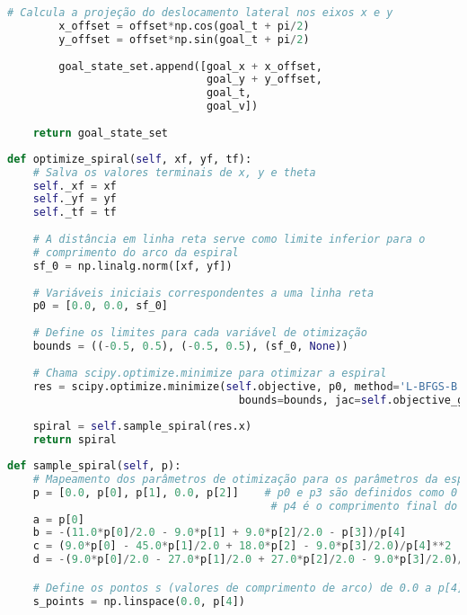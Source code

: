 \documentclass[
	12pt,				%
	oneside, %
	a4paper,			%
	english,			%
	french,				%
	spanish,			%
	brazil				%
	]{abntex2}
\begin{document}
\begin{apendicesenv}
\begin{lstlisting}[language=Python, caption=Implementação do método para geração de estados-objetivo do \textit{Conformal Lattice Planner}., label=lst:get_goal_state_set_implementation]
        # Calcula a projeção do deslocamento lateral nos eixos x e y
        x_offset = offset*np.cos(goal_t + pi/2)
        y_offset = offset*np.sin(goal_t + pi/2)
        
        goal_state_set.append([goal_x + x_offset, 
                               goal_y + y_offset, 
                               goal_t, 
                               goal_v])
       
    return goal_state_set
\end{lstlisting}

\begin{lstlisting}[language=Python, caption=Implementação do método de otimização de espirais paramétricas., label=lst:optimize_spiral_implementation]
def optimize_spiral(self, xf, yf, tf):
    # Salva os valores terminais de x, y e theta
    self._xf = xf
    self._yf = yf
    self._tf = tf
    
    # A distância em linha reta serve como limite inferior para o
    # comprimento do arco da espiral
    sf_0 = np.linalg.norm([xf, yf])
    
    # Variáveis iniciais correspondentes a uma linha reta
    p0 = [0.0, 0.0, sf_0]
    
    # Define os limites para cada variável de otimização
    bounds = ((-0.5, 0.5), (-0.5, 0.5), (sf_0, None))
    
    # Chama scipy.optimize.minimize para otimizar a espiral
    res = scipy.optimize.minimize(self.objective, p0, method='L-BFGS-B', 
                                    bounds=bounds, jac=self.objective_grad)
    
    spiral = self.sample_spiral(res.x)
    return spiral
\end{lstlisting}

\begin{lstlisting}[language=Python, caption=Implementação do método para amostragem de pontos ao longo da espiral otimizada., label=lst:sample_spiral_implementation]
def sample_spiral(self, p):
    # Mapeamento dos parâmetros de otimização para os parâmetros da espiral
    p = [0.0, p[0], p[1], 0.0, p[2]]    # p0 e p3 são definidos como 0
                                         # p4 é o comprimento final do arco
    a = p[0]
    b = -(11.0*p[0]/2.0 - 9.0*p[1] + 9.0*p[2]/2.0 - p[3])/p[4]
    c = (9.0*p[0] - 45.0*p[1]/2.0 + 18.0*p[2] - 9.0*p[3]/2.0)/p[4]**2
    d = -(9.0*p[0]/2.0 - 27.0*p[1]/2.0 + 27.0*p[2]/2.0 - 9.0*p[3]/2.0)/p[4]**3

    # Define os pontos s (valores de comprimento de arco) de 0.0 a p[4]
    s_points = np.linspace(0.0, p[4])
    

\end{lstlisting}
\end{apendicesenv}
\end{document}
